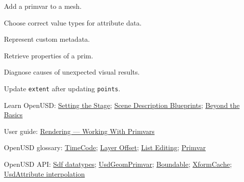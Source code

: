 
\begin{Objectives}
  \item Add a primvar to a mesh.
  \item Choose correct value types for attribute data.
  \item Represent custom metadata.
  \item Retrieve properties of a prim.
  \item Diagnose causes of unexpected visual results.
  \item Update \texttt{extent} after updating \texttt{points}.
\end{Objectives}

\begin{Resources}
  \item Learn OpenUSD: \href{https://docs.nvidia.com/learn-openusd/latest/stage-setting/index.html}{Setting the Stage};
        \href{https://docs.nvidia.com/learn-openusd/latest/scene-description-blueprints/index.html}{Scene Description Blueprints};
        \href{https://docs.nvidia.com/learn-openusd/latest/beyond-basics/index.html}{Beyond the Basics}
  \item User guide: \href{https://openusd.org/release/user_guides/render_user_guide.html#working-with-primvars}{Rendering --- Working With Primvars}
  \item OpenUSD glossary: \href{https://openusd.org/release/glossary.html#usdglossary-timecode}{TimeCode}; \href{https://openusd.org/release/glossary.html#layer-offset}{Layer Offset}; \href{https://openusd.org/release/glossary.html#list-editing}{List Editing}; \href{https://openusd.org/release/glossary.html#usdglossary-primvar}{Primvar}
  \item OpenUSD API: \href{https://openusd.org/release/api/_usd__page__datatypes.html}{Sdf datatypes};
        \href{https://openusd.org/release/api/class_usd_geom_primvar.html}{UsdGeomPrimvar};
        \href{https://openusd.org/release/api/class_usd_geom_boundable.html}{Boundable};
        \href{https://openusd.org/release/api/class_usd_geom_xform_cache.html}{XformCache};
        \href{https://openusd.org/release/api/class_usd_attribute.html#Usd_AttributeInterpolation}{UsdAttribute interpolation}
\end{Resources}

